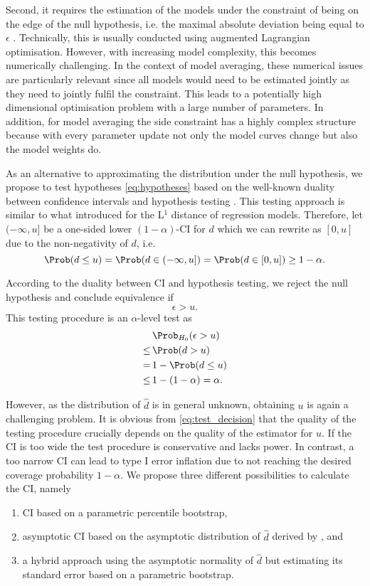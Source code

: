 {Second, it requires the estimation of the models under the constraint of being on the edge of the null hypothesis, i.e. the maximal absolute deviation being equal to $\epsilon$ \citep[see Algorithm 1 in][]{Dette2018}.
Technically, this is usually conducted using augmented Lagrangian optimisation.
However, with increasing model complexity, this becomes numerically challenging. In the context of model averaging, these numerical issues are particularly relevant since all models would need to be estimated jointly as they need to jointly fulfil the constraint. This leads to a potentially high dimensional optimisation problem with a large number of parameters. In addition, for model averaging the side constraint has a highly complex structure because with every parameter update not only the model curves change but also the model weights do.

As an alternative to approximating the distribution under the null hypothesis, we propose to test hypotheses \eqref{eq:hypotheses} based on the well-known duality between confidence intervals and hypothesis testing \citep{Aitchison1964}. This testing approach is similar to what \citet[][Algorithm 1]{Bastian2024} introduced for the L$^1$ distance of regression models. 
Therefore, let $(-\infty, u]$ be a one-sided lower $(1-\alpha)$-CI for $d$ which we can rewrite as $[0, u]$ due to the non-negativity of $d$, i.e.
$$
\Prob(d \leq u)=\Prob(d \in (-\infty, u])=\Prob(d \in [0, u]) \geq 1-\alpha.
$$

According to the duality between CI and hypothesis testing, we reject the null hypothesis and conclude equivalence if
\begin{equation} \label{eq:test_decision}
    \epsilon > u.
\end{equation}
This testing procedure is an $\alpha$-level test as
\begin{align*}
    & \, \Prob_{H_0}(\epsilon > u)\\
    \leq & \, \Prob(d > u) \\
    =& \, 1 - \Prob(d \leq u) \\
    \leq & \, 1-(1-\alpha) = \alpha.
\end{align*}

However, as the distribution of $\hat d$ is in general unknown, obtaining $u$ is again a challenging problem. It is obvious from \eqref{eq:test_decision} that the quality of the testing procedure crucially depends on the quality of the estimator for $u$. If the CI is too wide
the test procedure is conservative and lacks power. In contrast, a too narrow CI can lead to type I
error inflation due to not reaching the desired coverage probability $1- \alpha$.
We propose three different possibilities to calculate the CI, namely
\begin{enumerate}
    \item CI based on a parametric percentile bootstrap,
    \item asymptotic CI based on the asymptotic distribution of $\hat d$ derived by \citet{Dette2018}, and
    \item a hybrid approach using the asymptotic normality of $\hat d$ but estimating its standard error based on a parametric bootstrap.
\end{enumerate}

}
